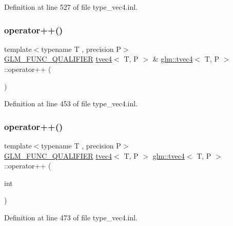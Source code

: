 Definition at line 527 of file type\+\_\+vec4.\+inl.

\mbox{\label{structglm_1_1tvec4_a63ee9187003ff40cb781a3cf3959475f}} 
\subsubsection{\texorpdfstring{operator++()}{operator++()}\hspace{0.1cm}{\footnotesize\ttfamily [1/2]}}
{\footnotesize\ttfamily template$<$typename T , precision P$>$ \\
\mbox{\hyperlink{setup_8hpp_a33fdea6f91c5f834105f7415e2a64407}{G\+L\+M\+\_\+\+F\+U\+N\+C\+\_\+\+Q\+U\+A\+L\+I\+F\+I\+ER}} \mbox{\hyperlink{structglm_1_1tvec4}{tvec4}}$<$ T, P $>$ \& \mbox{\hyperlink{structglm_1_1tvec4}{glm\+::tvec4}}$<$ T, P $>$\+::operator++ (\begin{DoxyParamCaption}{ }\end{DoxyParamCaption})}



Definition at line 453 of file type\+\_\+vec4.\+inl.

\mbox{\label{structglm_1_1tvec4_ad341796b1b7f91afcea916911db25bc6}} 
\subsubsection{\texorpdfstring{operator++()}{operator++()}\hspace{0.1cm}{\footnotesize\ttfamily [2/2]}}
{\footnotesize\ttfamily template$<$typename T , precision P$>$ \\
\mbox{\hyperlink{setup_8hpp_a33fdea6f91c5f834105f7415e2a64407}{G\+L\+M\+\_\+\+F\+U\+N\+C\+\_\+\+Q\+U\+A\+L\+I\+F\+I\+ER}} \mbox{\hyperlink{structglm_1_1tvec4}{tvec4}}$<$ T, P $>$ \mbox{\hyperlink{structglm_1_1tvec4}{glm\+::tvec4}}$<$ T, P $>$\+::operator++ (\begin{DoxyParamCaption}\item[{int}]{ }\end{DoxyParamCaption})}



Definition at line 473 of file type\+\_\+vec4.\+inl.

